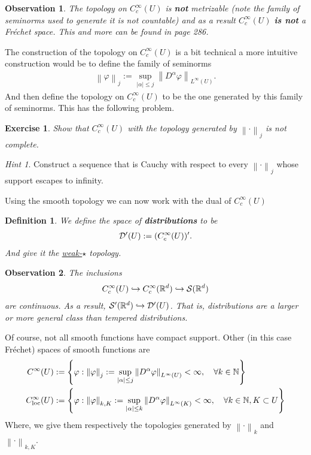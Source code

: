 \documentclass[12pt]{article}
\newtheorem{observation}{Observation}
\newtheorem{definition}{Definition}
\newtheorem{exercise}{Exercise}
\theoremstyle{remark}
\newtheorem*{hint}{Hint}
\renewcommand{\norm}[1]{\left\lVert #1 \right\rVert}\renewcommand{\abs}[1]{\left| #1 \right|}
\begin{document}
\begin{observation}
	The topology on $C_c^\infty(U)$ is \textbf{not} metrizable (note the family of seminorms used to generate it is not countable) and as a result $C_c^\infty(U)$ \textbf{is not} a Fréchet space. This and more can be found in \cite{leoni2017first} page 286.
\end{observation}
The construction of the topology on $C_c^\infty(U)$ is a bit technical a more intuitive construction would be to define the family of seminorms
\begin{align*}
	\norm{\varphi}_j := \sup_{\abs{\alpha} \leq j}  \norm{D^\alpha \varphi}_{L^\infty(U)}.
\end{align*}
And then define the topology on $C_c^\infty(U)$ to be the one generated by this family of seminorms. This has the following problem.
\begin{exercise}
	Show that $C_c^\infty(U)$ with the topology generated by $\norm{\cdot }_j$ is not complete.
\end{exercise}
\begin{hint}
	Construct a  sequence that is Cauchy with respect to every $\norm{\cdot }_j$ whose support escapes to infinity.
\end{hint}
Using the smooth topology we can now work with the dual of $C_c^\infty(U)$
\begin{definition}
	We define the space of \textbf{distributions} to be
	\begin{align*}
		\mathcal{D}'(U):= (C_c^\infty(U))'.
	\end{align*}
	And give it the \href{https://en.wikipedia.org/wiki/Weak_topology}{weak-$\star$} topology.
\end{definition}
\begin{observation}
	The inclusions
	\begin{align*}
		C_c^\infty(U) \hookrightarrow C_c^\infty(\mathbb{R}^d) \hookrightarrow \mathcal{S}(\mathbb{R}^d)
	\end{align*}
	are continuous. As a result, $\mathcal{S}'(\mathbb{R}^d) \hookrightarrow \mathcal{D}'(U)$. That is, distributions are a larger or more general class than tempered distributions.
\end{observation}
Of course, not all smooth functions have compact support. Other (in this case Fréchet) spaces of smooth functions are
\begin{align*}
	C^\infty(U)                & :=\set{\varphi: \norm{\varphi}_j:= \sup_{\abs{\alpha} \leq j}  \norm{D^\alpha \varphi}_{L^\infty(U)}<\infty,\quad \forall k \in \mathbb{N} }                  \\
	C^\infty_{\mathrm{loc}}(U) & :=\set{\varphi: \norm{\varphi}_{k,K}:= \sup_{\abs{\alpha} \leq k}  \norm{D^\alpha \varphi}_{L^\infty(K)}<\infty,\quad \forall k \in \mathbb{N}, K \subset U }
\end{align*}
Where, we give them respectively the topologies generated by $\norm{\cdot}_k$ and $\norm{\cdot}_{k,K}$.
\end{document}
